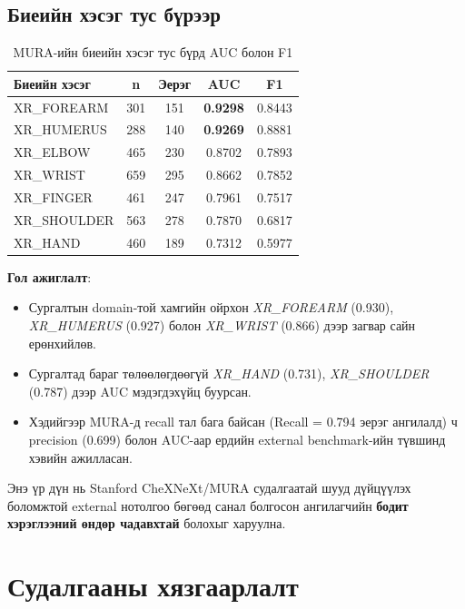 \subsection*{Биеийн хэсэг тус бүрээр}

\begin{table}[!htbp]
    \centering
    \begin{tabular}{l c c c c}
    \toprule
    \textbf{Биеийн хэсэг} & \textbf{n} & \textbf{Эерэг} & \textbf{AUC} & \textbf{F1} \\
    \midrule
    XR\_FOREARM   & 301 & 151 & \textbf{0.9298} & 0.8443 \\[4pt]
    XR\_HUMERUS   & 288 & 140 & \textbf{0.9269} & 0.8881 \\[4pt]
    XR\_ELBOW     & 465 & 230 & 0.8702 & 0.7893 \\[4pt]
    XR\_WRIST     & 659 & 295 & 0.8662 & 0.7852 \\[4pt]
    XR\_FINGER    & 461 & 247 & 0.7961 & 0.7517 \\[4pt]
    XR\_SHOULDER  & 563 & 278 & 0.7870 & 0.6817 \\[4pt]
    XR\_HAND      & 460 & 189 & 0.7312 & 0.5977 \\
    \bottomrule
    \end{tabular}
    \caption{MURA-ийн биеийн хэсэг тус бүрд AUC болон F1}
    \label{tab:mura_per_part}
\end{table}

\textbf{Гол ажиглалт}:

\begin{itemize}
    \item Сургалтын domain-той хамгийн ойрхон \textit{XR\_FOREARM} (0.930), \textit{XR\_HUMERUS} (0.927) болон \textit{XR\_WRIST} (0.866) дээр загвар сайн ерөнхийлөв.
    \item Сургалтад бараг төлөөлөгдөөгүй \textit{XR\_HAND} (0.731), \textit{XR\_SHOULDER} (0.787) дээр AUC мэдэгдэхүйц буурсан.
    \item Хэдийгээр MURA-д recall тал бага байсан (Recall = 0.794 эерэг ангилалд) ч precision (0.699) болон AUC-аар ердийн external benchmark-ийн түвшинд хэвийн ажилласан.
\end{itemize}

Энэ үр дүн нь Stanford CheXNeXt/MURA судалгаатай шууд дүйцүүлэх боломжтой external нотолгоо бөгөөд санал болгосон ангилагчийн \textbf{бодит хэрэглээний өндөр чадавхтай} болохыг харуулна.

\section{Судалгааны хязгаарлалт}

